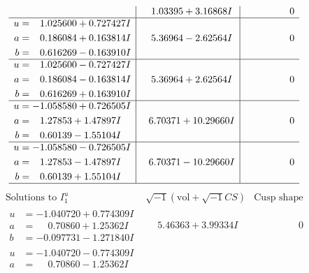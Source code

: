 \documentclass[1p]{elsarticle_modified}
\theoremstyle{definition}
\newcommand{\I}{\sqrt{-1}}
\begin{document}
$$\begin{array}{c|c|c}
 & \phantom{-}1.03395 + 3.16868 I & \phantom{-0.000000 } 0 \\ \hline\begin{aligned}
u &= \phantom{-}1.025600 + 0.727427 I \\
a &= \phantom{-}0.186084 + 0.163814 I \\
b &= \phantom{-}0.616269 - 0.163910 I\end{aligned}
 & \phantom{-}5.36964 - 2.62564 I & \phantom{-0.000000 } 0 \\ \hline\begin{aligned}
u &= \phantom{-}1.025600 - 0.727427 I \\
a &= \phantom{-}0.186084 - 0.163814 I \\
b &= \phantom{-}0.616269 + 0.163910 I\end{aligned}
 & \phantom{-}5.36964 + 2.62564 I & \phantom{-0.000000 } 0 \\ \hline\begin{aligned}
u &= -1.058580 + 0.726505 I \\
a &= \phantom{-}1.27853 + 1.47897 I \\
b &= \phantom{-}0.60139 - 1.55104 I\end{aligned}
 & \phantom{-}6.70371 + 10.29660 I & \phantom{-0.000000 } 0 \\ \hline\begin{aligned}
u &= -1.058580 - 0.726505 I \\
a &= \phantom{-}1.27853 - 1.47897 I \\
b &= \phantom{-}0.60139 + 1.55104 I\end{aligned}
 & \phantom{-}6.70371 - 10.29660 I & \phantom{-0.000000 } 0\\
 \hline 
 \end{array}$$\newpage$$\begin{array}{c|c|c}  
\text{Solutions to }I^u_{1}& \I (\text{vol} + \sqrt{-1}CS) & \text{Cusp shape}\\
 \hline 
\begin{aligned}
u &= -1.040720 + 0.774309 I \\
a &= \phantom{-}0.70860 + 1.25362 I \\
b &= -0.097731 - 1.271840 I\end{aligned}
 & \phantom{-}5.46363 + 3.99334 I & \phantom{-0.000000 } 0 \\ \hline\begin{aligned}
u &= -1.040720 - 0.774309 I \\
a &= \phantom{-}0.70860 - 1.25362 I \\

\end{aligned}
\end{array}$$
\end{document}
